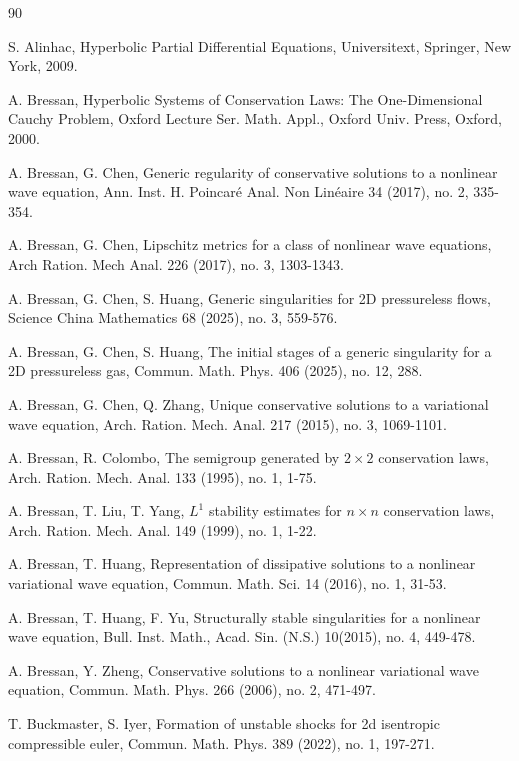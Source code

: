 \documentclass[11pt,reqno]{article}
\numberwithin{equation}{section}
\begin{document}
\begin{thebibliography}{90}
\addtolength{\itemsep}{-0.7em}


 S. Alinhac, Hyperbolic Partial Differential Equations, Universitext, Springer, New York, 2009.

 A. Bressan, Hyperbolic Systems of Conservation Laws: The One-Dimensional Cauchy Problem, Oxford Lecture Ser. Math. Appl., Oxford Univ. Press, Oxford, 2000.

 A. Bressan, G. Chen, Generic regularity of conservative solutions to a nonlinear wave equation, Ann. Inst. H. Poincar\'{e} Anal. Non Lin\'{e}aire 34 (2017), no. 2, 335-354.

 A. Bressan, G. Chen, Lipschitz metrics for a class of nonlinear wave equations, Arch Ration. Mech Anal. 226 (2017), no. 3, 1303-1343.

 A. Bressan, G. Chen, S. Huang, Generic singularities for 2D pressureless flows,  Science China Mathematics 68 (2025), no. 3, 559-576.

 A. Bressan, G. Chen, S. Huang, The initial stages of a generic singularity for a 2D pressureless gas, Commun. Math. Phys. 406 (2025), no. 12, 288.

 A. Bressan, G. Chen, Q. Zhang, Unique conservative solutions to a variational wave equation, Arch. Ration. Mech. Anal. 217 (2015), no. 3, 1069-1101.

A. Bressan, R. Colombo, The semigroup generated by $2\times 2$ conservation laws,
Arch. Ration. Mech. Anal. 133 (1995), no. 1, 1-75.

A. Bressan, T. Liu, T. Yang, $L^1$ stability estimates for $n\times n$ conservation laws, Arch. Ration. Mech. Anal.  149 (1999),  no. 1, 1-22.

 A. Bressan, T. Huang, Representation of dissipative solutions to a nonlinear variational wave equation, Commun. Math. Sci. 14 (2016), no. 1, 31-53.


 A. Bressan, T. Huang, F. Yu, Structurally stable singularities for a nonlinear wave equation, Bull. Inst. Math., Acad. Sin. (N.S.) 10(2015), no. 4, 449-478.


 A. Bressan, Y. Zheng, Conservative solutions to a nonlinear variational wave equation, Commun. Math. Phys. 266 (2006), no. 2, 471-497.


 T. Buckmaster, S. Iyer, Formation of unstable shocks for 2d isentropic compressible euler, Commun. Math. Phys. 389 (2022), no. 1, 197-271.


\end{thebibliography}
\end{document}
